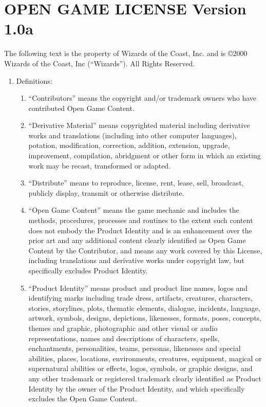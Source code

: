 \chapter{OPEN GAME LICENSE Version 1.0a}\label{sec:OGL}

{\raggedright
The following text is the property of Wizards of the Coast, Inc.  and is \copyright 2000 Wizards of the Coast, Inc (``Wizards''). All Rights Reserved.

\begin{enumerate}
\item

Definitions:
\begin{enumerate}
\item
``Contributors'' means the copyright and/or trademark owners who have contributed Open Game Content.
\item
``Derivative Material'' means copyrighted material including derivative works and translations (including into other computer languages), potation, modification, correction, addition, extension, upgrade, improvement, compilation, abridgment or other form in which an existing work may be recast, transformed or adapted.
\item
``Distribute'' means to reproduce, license, rent, lease, sell, broadcast, publicly display, transmit or otherwise distribute.
\item
``Open Game Content'' means the game mechanic and includes the methods, procedures, processes and routines to the extent such content does not embody the Product Identity and is an enhancement over the prior art and any additional content clearly identified as Open Game Content by the Contributor, and means any work covered by this License, including translations and derivative works under copyright law, but specifically excludes Product Identity.
\item
``Product Identity'' means product and product line names, logos and identifying marks including trade dress, artifacts, creatures, characters, stories, storylines, plots, thematic elements, dialogue, incidents, language, artwork, symbols, designs, depictions, likenesses, formats, poses, concepts, themes and graphic, photographic and other visual or audio representations, names and descriptions of characters, spells, enchantments, personalities, teams, personas, likenesses and special abilities, places, locations, environments, creatures, equipment, magical or supernatural abilities or effects, logos, symbols, or graphic designs, and any other trademark or registered trademark clearly identified as Product Identity by the owner of the Product Identity, and which specifically excludes the Open Game Content.

\end{enumerate}
\end{enumerate}}
